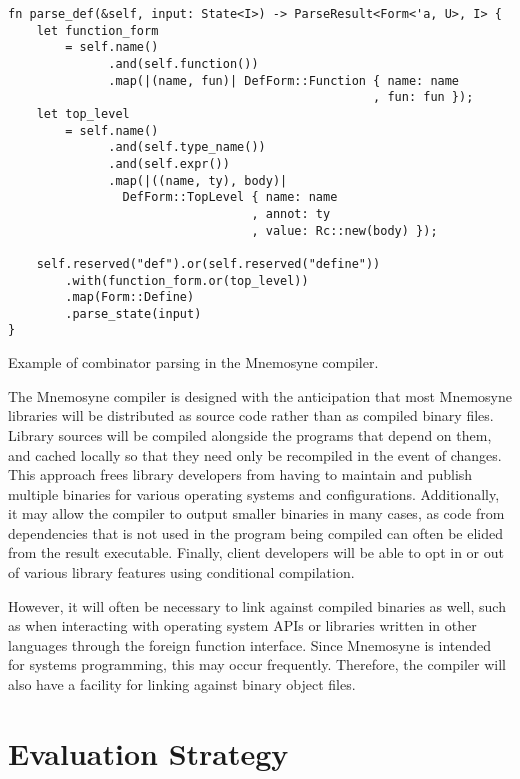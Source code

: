 \documentclass[11pt,a4paper]{article}
\theoremstyle{break}
\begin{document}
\begin{listing}[ht]
    \begin{verbatim}
fn parse_def(&self, input: State<I>) -> ParseResult<Form<'a, U>, I> {
    let function_form
        = self.name()
              .and(self.function())
              .map(|(name, fun)| DefForm::Function { name: name
                                                   , fun: fun });
    let top_level
        = self.name()
              .and(self.type_name())
              .and(self.expr())
              .map(|((name, ty), body)|
                DefForm::TopLevel { name: name
                                  , annot: ty
                                  , value: Rc::new(body) });

    self.reserved("def").or(self.reserved("define"))
        .with(function_form.or(top_level))
        .map(Form::Define)
        .parse_state(input)
}
    \end{verbatim}
    \label{lst:combinator}
    \caption{Example of combinator parsing in the Mnemosyne compiler.}
\end{listing}

The Mnemosyne compiler is designed with the anticipation that most Mnemosyne libraries will be distributed as source code rather than as compiled binary files. Library sources will be compiled alongside the programs that depend on them, and cached locally so that they need only be recompiled in the event of changes. This approach frees library developers from having to maintain and publish multiple binaries for various operating systems and configurations. Additionally, it may allow the compiler to output smaller binaries in many cases, as code from dependencies that is not used in the program being compiled can often be elided from the result executable. Finally, client developers will be able to opt in or out of various library features using conditional compilation.

However, it will often be necessary to link against compiled binaries as well, such as when interacting with operating system APIs or libraries written in other languages through the foreign function interface. Since Mnemosyne is intended for systems programming, this may occur frequently. Therefore, the compiler will also have a facility for linking against binary object files.

\vspace*{-.2in}
\section{Evaluation Strategy}
\label{sec:evaluate}
\vspace*{-.1in}
\end{document}
